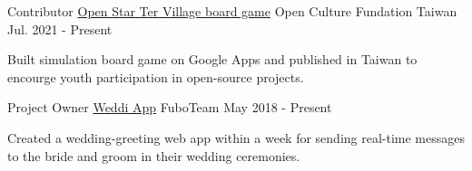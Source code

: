 

\begin{cventries}

  \cventry
  {Contributor} %
  {\href{https://github.com/ocftw/open-star-ter-village}{\faGithubSquare\acvHeaderIconSep Open Star Ter Village board game}} %
  {Open Culture Fundation Taiwan} %
  {Jul. 2021 - Present} %
  {
    \begin{cvitems} %
      \item {Built simulation board game on Google Apps and published in Taiwan to encourge youth participation in open-source projects.}
    \end{cvitems}
  }

  \cventry
  {Project Owner} %
  {\href{https://github.com/fuboteam/weddi-app}{\faGithubSquare\acvHeaderIconSep Weddi App}} %
  {FuboTeam} %
  {May 2018 - Present} %
  {
    \begin{cvitems} %
      \item {Created a wedding-greeting web app within a week for sending real-time messages to the bride and groom in their wedding ceremonies.}
    \end{cvitems}
  }

\end{cventries}
